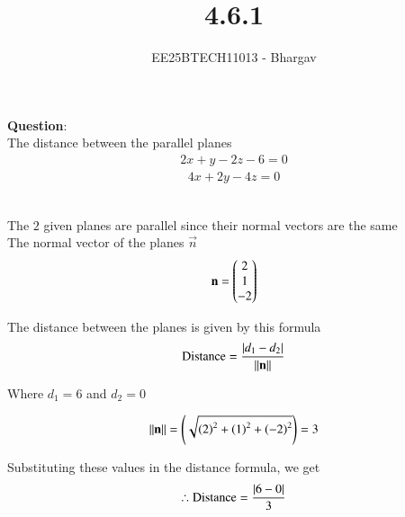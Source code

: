 \documentclass[journal]{IEEEtran}
\begin{document}

\vspace{3cm}

\title{4.6.1}
\author{EE25BTECH11013 - Bhargav}
\maketitle
{\let\newpage\relax\maketitle}

\renewcommand{\thefigure}{\theenumi}
\renewcommand{\thetable}{\theenumi}
\setlength{\intextsep}{10pt} %


\renewcommand{\thetable}{\theenumi}

\textbf{Question}:\\
The distance between the parallel planes 
\begin{align}
2x + y - 2z - 6 = 0
\end{align}
\begin{align}
4x + 2y - 4z = 0
\end{align}

\solution \\

The $2$ given planes are parallel since their normal vectors are the same\\

The normal vector of the planes $\vec{n}$
\begin{align}
\mathbf{n} = \begin{pmatrix}2 \\ 1 \\ -2\end{pmatrix}
\end{align}



The distance between the planes is given by this formula
\begin{align}
\text{Distance} = \frac{\left\vert d_1 - d_2\right\vert}{\left\lVert\mathbf{n}\right\rVert}
\end{align}

Where $d_1 = 6$ and $d_2 = 0$

\begin{align}
{\left\lVert\mathbf{n}\right\rVert} = \left(\sqrt{\left(2\right)^2 + \left(1\right)^2 + \left(-2\right)^2}\right) = 3
\end{align}


Substituting these values in the distance formula, we get\\
\begin{align}
\therefore \text{Distance} = \frac{\left\vert6-0\right\vert}{3}
\end{align}
\end{document}
